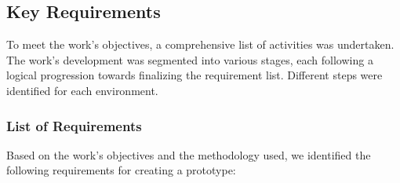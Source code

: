 \documentclass[12pt]{article}
\begin{document}
\subsection{Key Requirements}

To meet the work's objectives, a comprehensive list of activities was undertaken. The work's development was segmented into various stages, each following a logical progression towards finalizing the requirement list. Different steps were identified for each environment.

\subsubsection{List of Requirements}

Based on the work's objectives and the methodology used, we identified the following requirements for creating a prototype:
\end{document}
